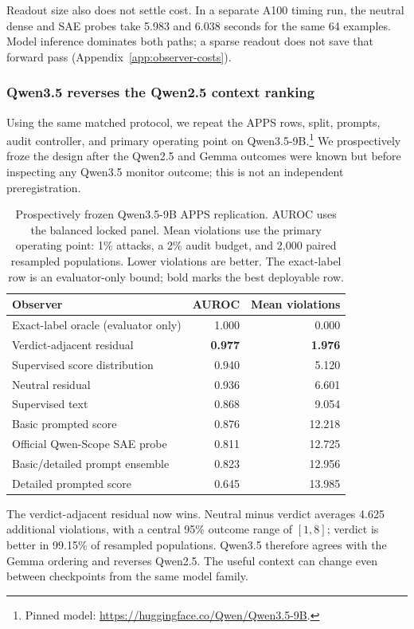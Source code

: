Readout size also does not settle cost. In a separate A100 timing run, the
neutral dense and SAE probes take 5.983 and 6.038 seconds for the same 64
examples. Model inference dominates both paths; a sparse readout does not save
that forward pass (Appendix~\ref{app:observer-costs}).

\subsubsection{Qwen3.5 reverses the Qwen2.5 context ranking}

Using the same matched protocol, we repeat the APPS rows, split, prompts, audit
controller, and primary operating point on Qwen3.5-9B.\footnote{Pinned model:
\url{https://huggingface.co/Qwen/Qwen3.5-9B}.} We prospectively froze the
design after the Qwen2.5 and Gemma outcomes were known but before inspecting
any Qwen3.5 monitor outcome; this is not an independent preregistration.

\begin{table}[H]
\centering
\small
\caption{Prospectively frozen Qwen3.5-9B APPS replication. AUROC uses the
balanced locked panel. Mean violations use the primary operating point: 1\%
attacks, a 2\% audit budget, and 2,000 paired resampled populations. Lower
violations are better. The exact-label row is an evaluator-only bound; bold
marks the best deployable row.}
\label{tab:qwen35-apps-monitor-long}
\begin{tabular}{@{}lrr@{}}
\toprule
Observer & AUROC & Mean violations \\
\midrule
Exact-label oracle (evaluator only) & 1.000 & 0.000 \\
Verdict-adjacent residual & \textbf{0.977} & \textbf{1.976} \\
Supervised score distribution & 0.940 & 5.120 \\
Neutral residual & 0.936 & 6.601 \\
Supervised text & 0.868 & 9.054 \\
Basic prompted score & 0.876 & 12.218 \\
Official Qwen-Scope SAE probe & 0.811 & 12.725 \\
Basic/detailed prompt ensemble & 0.823 & 12.956 \\
Detailed prompted score & 0.645 & 13.985 \\
\bottomrule
\end{tabular}
\end{table}

The verdict-adjacent residual now wins. Neutral minus verdict averages 4.625
additional violations, with a central 95\% outcome range of $[1,8]$; verdict is
better in 99.15\% of resampled populations. Qwen3.5 therefore agrees with the
Gemma ordering and reverses Qwen2.5. The useful context can change even between
checkpoints from the same model family.

